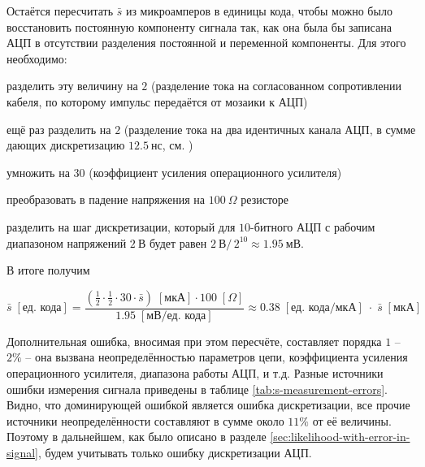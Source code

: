 \documentclass[12pt]{book}
\begin{document}
	Остаётся пересчитать $\bar{s}$ из микроамперов в единицы кода, чтобы можно было восстановить постоянную компоненту сигнала так, как она была бы записана АЦП в отсутствии разделения постоянной и переменной компоненты. Для этого необходимо:
	\begin{enumerate*}[label=\arabic*)]
		\item разделить эту величину на $2$ (разделение тока на согласованном сопротивлении кабеля, по которому импульс передаётся от мозаики к АЦП)
		\item ещё раз разделить на $2$ (разделение тока на два идентичных канала АЦП, в сумме дающих дискретизацию $12.5~\text{нс}$, см. \cite{SphereDetector2020})
		\item умножить на $30$ (коэффициент усиления операционного усилителя)
		\item преобразовать в падение напряжения на $100~\Omega$ резисторе
		\item разделить на шаг дискретизации, который для $10$-битного АЦП с рабочим диапазоном напряжений $2~\text{В}$ будет равен $2~\text{В} / \, 2^{10} \approx 1.95~\text{мВ}$.
	\end{enumerate*}
	В итоге получим
	
	\begin{equation}
		\label{eq:current-muA-to-code-units-conversion}
		\bar{s} \; [\text{ед. кода}] = \frac{\left(\frac{1}{2} \cdot \frac{1}{2} \cdot 30 \cdot \bar{s} \right) \; [ \text{мкА}] \cdot 100 \; [\Omega]}{1.95 \; [\text{мВ} / \text{ед. кода}]} \approx 0.38 \; [\text{ед. кода} / \text{мкА}] \;\cdot\; \bar{s} \; [\text{мкА}]
	\end{equation}

	Дополнительная ошибка, вносимая при этом пересчёте, составляет порядка $1$ -- $2\%$ -- она вызвана неопределённостью параметров цепи, коэффициента усиления операционного усилителя, диапазона работы АЦП, и т.д. Разные источники ошибки измерения сигнала приведены в таблице \ref{tab:s-measurement-errors}. Видно, что доминирующей ошибкой является ошибка дискретизации, все прочие источники неопределённости составляют в сумме около $11\%$ от её величины. Поэтому в дальнейшем, как было описано в разделе \ref{sec:likelihood-with-error-in-signal}, будем учитывать только ошибку дискретизации АЦП.
\end{document}
